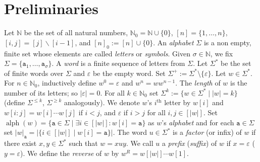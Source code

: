 \documentclass[10pt,a4paper]{amsart}
\newcommand{\N}{\mathbb{N}}
\def\ta{\mathtt{a}}
\def\tb{\mathtt{b}}
\renewcommand{\epsilon}{\varepsilon}
\DeclareMathOperator{\letters}{alph}
\DeclareMathOperator{\Pref}{Pref}
\def\nth#1{#1$^{\text{th}}$}
\theoremstyle{plain}
\theoremstyle{definition}
\begin{document}


	
	
	\section{Preliminaries}\label{sec:prelims}
Let $\mathbb{N}$ be the set of all natural numbers, $\mathbb{N}_0 = \mathbb{N} \cup \{0\}$, 
$[n] = \{1,\ldots,n\}$, $[i,j]=[j]\backslash[i-1]$, and $[n]_0 := [n] \cup \{0\}$. An \emph{alphabet} 
$\Sigma$ is a non empty, finite set whose elements are called \emph{letters} or {\em symbols}.
Given $\sigma\in\N$, we fix  $\Sigma=\{\ta_1,\ldots,\ta_{\sigma}\}$.  A \emph{word} is a 
finite sequence of letters from $\Sigma$. Let $\Sigma^*$ be 
the set of finite words over $\Sigma$ and $\epsilon$ be the empty word. %
Set $\Sigma^+ := \Sigma^* \setminus \{\epsilon\}$. Let $w\in\Sigma^{\ast}$. 
For $n\in\N_0$, inductively define 
$w^0=\varepsilon$ and $w^n=ww^{n-1}$. 
The {\em length} of $w$ is the number of its letters; so $|\epsilon| = 0$. 
For all $k \in \mathbb{N}_0$ set $\Sigma^k := \{w \in \Sigma^* \mid |w| = k\}$ (define $\Sigma^{\leq k}$, $\Sigma^{\geq k}$ analogously). We denote $w$'s \nth{$i$} letter by $w[i]$ 
and $w[i:j]=w[i]\cdots w[j]$ if $i < j$,  and $\epsilon$ if $ i > j$ for all $i,j \in [\vert w \vert]$. 
Set $\letters(w) = \{\ta \in \Sigma \mid \exists i \in [|w|]: w[i] = \ta \}$ as $w$'s {\em alphabet} and 
for each $\ta \in \Sigma$ set $|w|_{\ta} = |\{i \in [|w|] \mid w[i]=\ta \}|$. The word $u \in 
\Sigma^*$ is a \emph{factor} (or infix) of $w$ if there exist $x,y \in \Sigma^*$ such that $w = xuy$.
We call $u$ a \emph{prefix} (\emph{suffix}) of $w$ if $x=\epsilon$ ($y = \epsilon$). 
We define the \emph{reverse} of $w$ by $w^R = w[|w|]\cdots w[1]$.
\end{document}
